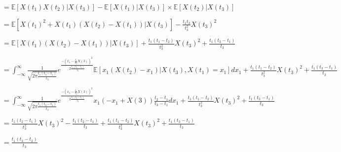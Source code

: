 \documentclass[a4paper]{article}
\begin{document}
\begin{itemize}
\begin{itemize}
\begin{itemize}
{                        $= \mathbb{E}[X(t_1)X(t_2)|X(t_3)] - \mathbb{E}[X(t_1)|X(t_3)] \times \mathbb{E}[X(t_2)|X(t_3)]$

                        $= \mathbb{E}[X(t_1)^2 + X(t_1)(X(t_2)-X(t_1))|X(t_3)] - \frac{t_1 t_2}{t_3^2} X(t_3)^2$

                        $= \mathbb{E}[X(t_1)(X(t_2)-X(t_1))|X(t_3)] + \frac{t_1 (t_1 - t_2)}{t_3^2} X(t_3)^2 + \frac{t_1(t_3- t_1)}{t_3}$

                        $= \int_{-\infty}^{\infty} \frac{1}{\sqrt{2\pi \frac{t_1(t_3 - t_1)}{t_3}}}e^{\frac{-(x_1 - \frac{t_1}{t_3}X(3))^2}{2\frac{t_1(t_3 - t_1)}{t_3}}} \mathbb{E}[x_1(X(t_2)-x_1)|X(t_3), X(t_1) = x_1] dx_1 + \frac{t_1 (t_1 - t_2)}{t_3^2} X(t_3)^2 + \frac{t_1(t_3- t_1)}{t_3}$

                        $= \int_{-\infty}^{\infty} \frac{1}{\sqrt{2\pi \frac{t_1(t_3 - t_1)}{t_3}}}e^{\frac{-(x_1 - \frac{t_1}{t_3}X(3))^2}{2\frac{t_1(t_3 - t_1)}{t_3}}} x_1(-x_1 + X(3))\frac{t_2-t_1}{t_3-t_1} dx_1 + \frac{t_1 (t_1 - t_2)}{t_3^2} X(t_3)^2 + \frac{t_1(t_3- t_1)}{t_3}$

                        $= \frac{t_1(t_2 - t_1)}{t_3^2}X(t_3)^2 - \frac{t_1(t_2-t_1)}{t_3} + \frac{t_1 (t_1 - t_2)}{t_3^2} X(t_3)^2 + \frac{t_1(t_3- t_1)}{t_3}$


                        $= \frac{t_1(t_3-t_2)}{t_3}$
                    }
                \end{itemize}
        \end{itemize}
\end{itemize}
\end{document}
